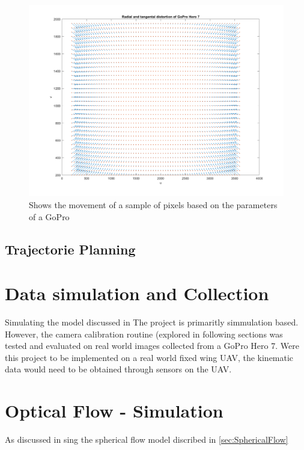 \documentclass{UoNMCHA}
\numberwithin{equation}{section}
\begin{document}
\begin{figure}[ht]
    \begin{center}
        \includegraphics[width=.9\linewidth]{Figures/Matlab/DistortionMovement}
        \caption{Shows the movement of a sample of pixels based on the parameters of a GoPro}
        \label{fig:DistortionMovement}
    \end{center}
\end{figure}
\subsection{Trajectorie Planning}

\newpage
\section{Data simulation and Collection}
Simulating the model discussed in 
The project is primaritly simmulation based. However, the camera calibration routine (explored in following sections was tested and evaluated on real world images collected from a GoPro Hero 7. Were this project to be implemented on a real world fixed wing UAV, the kinematic data would need to be obtained through sensors on the UAV.

\newpage
\section{Optical Flow - Simulation}
As discussed in sing the spherical flow model discribed in \ref{sec:SphericalFlow}
\end{document}

